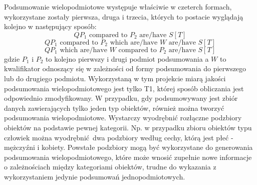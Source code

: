\documentclass{classrep}
\begin{document}
{        Podsumowanie wielopodmiotowe występuje właściwie w czeterch formach, wykorzystane zostały
        pierwsza, druga i trzecia, których to postacie wyglądają kolejno w następujący sposób:
        \begin{equation}
            Q P_1 \textrm{ compared to } P_2 \textrm{ are/have } S [T]
        \end{equation}
        \begin{equation}
            Q P_1 \textrm{ compared to } P_2 \textrm{ which are/have } W \textrm{ are/have } S [T]
        \end{equation}
        \begin{equation}
            Q P_1 \textrm{ which are/have } W \textrm{ compared to } P_2 \textrm{ are/have } S [T]
        \end{equation}
        gdzie $P_1$ i $P_2$ to kolejno pierwszy i drugi podmiot podsumowania a $W$ to kwalifikator
        odnoszący się w zależności od formy podsumowania do pierwszego lub do drugiego podmiotu.
        Wykorzystaną w tym projekcie miarą jakości podsumowania wielopodmiotowego jest tylko T1,
        której sposób obliczania jest odpowiednio zmodyfikowany. W przypadku, gdy podsumowywany jest
        zbiór danych zawierających tylko jeden typ obiektów, również można tworzyć podsumowania
        wielopodmiotowe.  Wystarczy wyodrębnić rozłączne podzbiory obiektów na podstawie pewnej
        kategorii. Np. w przypadku zbioru obiektów typu człowiek można wyodrębnić dwa podzbiory
        według cechy, którą jest płeć - mężczyźni i kobiety. Powstałe podzbiory mogą być
        wykorzystane do generowania podsumowania wielopodmiotowego, które może wnosić zupełnie nowe
        informacje o zależnościach między kategoriami obiektów, trudne do wykazania z wykorzystaniem
        jedynie podsumowań jednopodmiotowych.
    }
\end{document}

